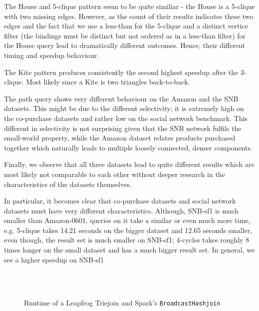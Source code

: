 The House and 5-clique pattern seem to be quite similiar - the House is a 5-clique with two missing
edges.
However, as the count of their results indicates these two edges and the fact that we use a less-than for the 5-clique and a distinct
vertice filter (the bindings must be distinct but not ordered as in a less-than filter) for the House query lead to dramatically different
outcomes.
Hence, their different timing and speedup behaviour.

The Kite pattern produces consistently the second highest speedup after the 3-clique.
Most likely since a Kite is two triangles back-to-back.

The path query shows very different behaviour on the Amazon and the SNB datasets.
This might be due to the different selectivity; it is extremely high on the co-purchase datasets and rather low on the social network
benchmark.
This different in selectivity is not surprising given that the SNB network fulfils the small-world property, while the
Amazon dataset relates products purchased together which naturally leads to multiple loosely connected, denser components.

Finally, we observe that all three datasets lead to quite different results which are most likely not comparable to each other without deeper research
in the characteristics of the datasets themselves.

In particular, it becomes clear that co-purchase datasets and social network datasets must have very different characteristics.
Although, SNB-sf1 is much smaller than Amazon-0601, queries on it take a similar or even much more time,
e.g. 5-clique takes 14.21 seconds on the bigger dataset and 12.65 seconds smaller, even though, the result set is much
smaller on SNB-sf1;
4-cycles takes roughly 8 times longer on the small dataset and has a much bigger result set.
In general, we see a higher speedup on SNB-sf1

\begin{figure}
    \centering
    \subfloat[Amazon0302]{
    
    
    }\\
    \subfloat[Amazon0601]{
    
    
    }\\
    \subfloat[SNB-sf-1]{
    
    
    }
    \caption{Runtime of a Leapfrog Triejoin and Spark's \texttt{BroadcastHashjoin}}
    \label{fig:spark-vs-lftj}
\end{figure}


